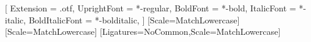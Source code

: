 \usepackage[english]{babel}

\usepackage{amsmath,amssymb,amsfonts}
\usepackage[utf8]{inputenc}

\usepackage{fontspec}
\usepackage{unicode-math}
\setmainfont{texgyretermes}[
  Extension = .otf,
  UprightFont = *-regular,
  BoldFont = *-bold,
  ItalicFont = *-italic,
  BoldItalicFont = *-bolditalic,
]
[Scale=MatchLowercase]
\setsansfont{TeX Gyre Heros}[Scale=MatchLowercase]
\setmonofont{TeX Gyre Cursor}[Ligatures=NoCommon,Scale=MatchLowercase]


\usepackage{lastpage}

\usepackage{gensymb}

\usepackage{setspace}

\usepackage{ccicons}

\usepackage[hang,flushmargin]{footmisc}

\usepackage{geometry}

\setlength{\parindent}{0pt}
\setlength{\parskip}{6pt plus 2pt minus 1pt}

\usepackage{fancyhdr}
\renewcommand{\headrulewidth}{0pt}